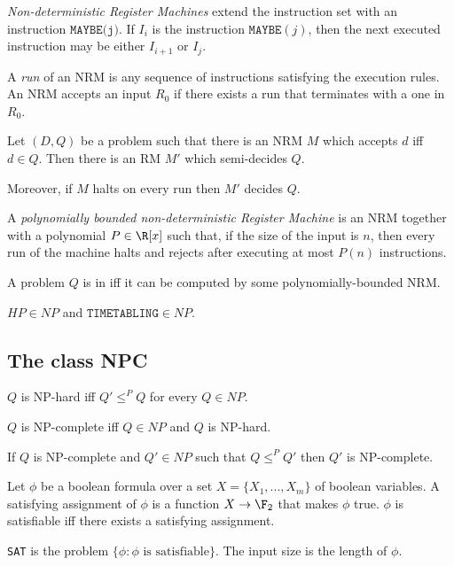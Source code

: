 \documentclass{article}
\begin{document}
\begin{definition*}[NRM]
	\emph{Non-deterministic Register Machines} extend the instruction set with an instruction
	$\texttt{MAYBE(j)}$. If $I_i$ is the instruction $\texttt{MAYBE}(j)$, then the next executed instruction
	may be either $I_{i+1}$ or $I_j$.

	A \emph{run} of an NRM is any sequence of instructions satisfying the execution rules. An NRM accepts
	an input $R_0$ if there exists a run that terminates with a one in $R_0$.
\end{definition*}

\begin{theorem*}[Notes II.10]
	Let $(D,Q)$ be a problem such that there is an NRM $M$ which accepts $d$ iff $d\in Q$.
	Then there is an RM $M'$ which semi-decides $Q$.

	Moreover, if $M$ halts on every run then $M'$ decides $Q$.
\end{theorem*}

\begin{definition*}[NP]
	A \emph{polynomially bounded non-deterministic Register Machine} is an NRM together with a polynomial
	$P\in\R[x]$ such that, if the size of the input is $n$, then every run of the machine halts and
	rejects after executing at most $P(n)$ instructions.

	A problem $Q$ is in \nptime iff it can be computed by some polynomially-bounded NRM.
\end{definition*}

\begin{theorem*}[Notes II.12]
	$HP\in NP$ and $\texttt{TIMETABLING}\in NP$.
\end{theorem*}

\subsection{The class NPC}

\begin{definition*}
	$Q$ is NP-hard iff $Q'\leq^P Q$ for every $Q\in NP$.

	$Q$ is NP-complete iff $Q\in NP$ and $Q$ is NP-hard.
\end{definition*}

\begin{theorem*}[II.15]
	If $Q$ is NP-complete and $Q'\in NP$ such that $Q\leq^P Q'$
	then $Q'$ is NP-complete.
\end{theorem*}

\begin{definition*}[SAT]
	Let $\phi$ be a boolean formula over a set $X=\{X_1, ..., X_m\}$ of
	boolean variables. A satisfying assignment of $\phi$ is a function
	$X\to\F_2$ that makes $\phi$ true. $\phi$ is satisfiable iff
	there exists a satisfying assignment.

	\texttt{SAT} is the problem $\{\phi : \phi \text{ is satisfiable}\}$.
	The input size is the length of $\phi$.
\end{definition*}
\end{document}
